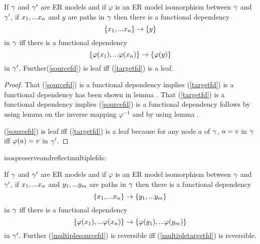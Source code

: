 \begin{lemma}
\label{isospreserveandreflectfds}
If $\gamma$ and $\gamma'$ are ER models and  if  $\varphi$ is an ER model isomorphism between $\gamma$  and $\gamma'$,  if $x_1,...x_n$ and $y$ are paths in $\gamma$
then there is a  functional dependency
\begin{equation}
\label{sourcefd}
\left\{x_1,...x_n\right\} \rightarrow \left\{y\right\}
\end{equation} 
in $\gamma$ iff there is a functional dependency
\begin{equation}
\label{targetfd}
\left\{\varphi(x_1),...\varphi(x_n)\right\} \rightarrow \left\{\varphi(y)\right\}
\end{equation}
in $\gamma'$.
Further(\ref{sourcefd}) is  leaf  iff (\ref{targetfd}) is a leaf.

\end{lemma}
\begin{proof}
\vspace{0.5cm}
That (\ref{sourcefd}) is a functional dependency implies
(\ref{targetfd}) is a functional dependency has been shown in lemma . That (\ref{targetfd}) is a functional dependency implies
(\ref{sourcefd}) is a functional dependency follows by using lemma 
on the inverse mapping $\varphi^{-1}$ and by using lemma  .

(\ref{sourcefd}) is  leaf  iff (\ref{targetfd}) is a leaf 
because for any node $a$ of $\gamma$, $a= v$ in $\gamma$ iff $\varphi(a)=v$ in $\gamma'$.
\end{proof}

isospreserveandreflectmultiplefds:
\begin{corollary}
If $\gamma$ and $\gamma'$ are ER models and  if  $\varphi$ is an ER model isomorphism between $\gamma$  and $\gamma'$,  if $x_1,...x_n$ and $y_1,...y_{m}$ are paths 
in $\gamma$
then there is a  functional dependency
\begin{equation}
\label{multiplesourcefd}
\left\{x_1,...x_n\right\} \rightarrow \left\{y_1,...y_{m}\right\}
\end{equation} 
in $\gamma$ iff there is a functional dependency
\begin{equation}
\label{multipletargetfd}
\left\{\varphi(x_1),...\varphi(x_n)\right\} \rightarrow \left\{\varphi(y_1),...\varphi(y_m)\right\}
\end{equation}
in $\gamma'$.
Further (\ref{multiplesourcefd}) is reversible iff (\ref{multipletargetfd}) is reversible.
\end{corollary}

